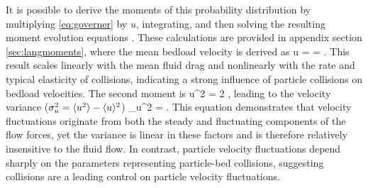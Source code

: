 It is possible to derive the moments of this probability distribution by multiplying \ref{eq:governer} by $u$, integrating, and then solving the resulting moment evolution equations \citep[c.f.][]{Cox1965}.
These calculations are provided in appendix section \ref{sec:langmoments}, where the mean bedload velocity is derived as
\be \langle u \rangle =  = .\ee
This result scales linearly with the mean fluid drag and nonlinearly with the rate and typical elasticity of collisions, indicating a strong influence of particle collisions on bedload velocities.
The second moment is
\be \langle u^2 \rangle = 2 , \ee
leading to the velocity variance ($\sigma_u^2 = \langle u^2 \rangle - \langle u \rangle ^2 $)
\be \sigma_u^2 = .\ee
This equation demonstrates that velocity fluctuations originate from both the steady and fluctuating components of the flow forces, yet the variance is linear in these factors and is therefore relatively insensitive to the fluid flow.
In contrast, particle velocity fluctuations depend sharply on the parameters representing particle-bed collisions, suggesting collisions are a leading control on particle velocity fluctuations.

